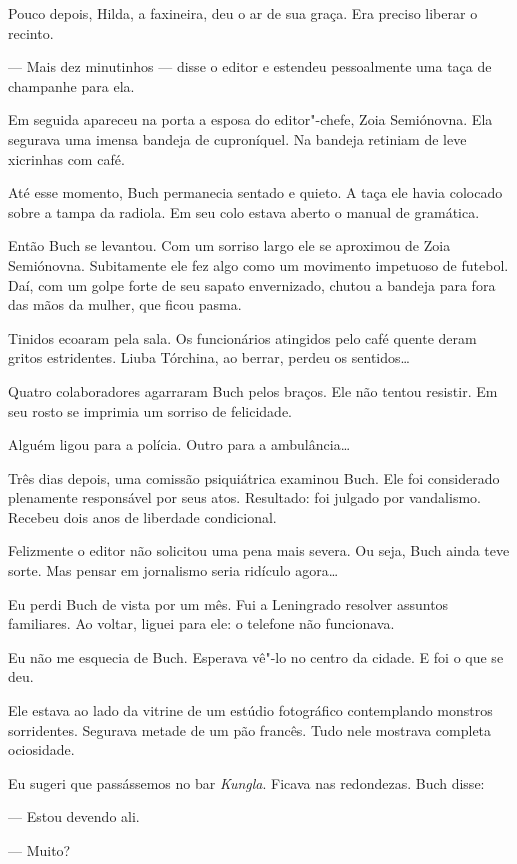 Pouco depois, Hilda, a faxineira, deu o ar de sua graça. Era preciso
liberar o recinto.

--- Mais dez minutinhos --- disse o editor e estendeu pessoalmente uma
taça de champanhe para ela.

Em seguida apareceu na porta a esposa do editor"-chefe, Zoia Semiónovna.
Ela segurava uma imensa bandeja de cuproníquel. Na bandeja retiniam de
leve xicrinhas com café.

Até esse momento, Buch permanecia sentado e quieto. A taça ele havia colocado
sobre a tampa da radiola. Em seu colo estava aberto o manual de
gramática.

Então Buch se levantou. Com um sorriso largo ele se aproximou de Zoia
Semiónovna. Subitamente ele fez algo como um movimento impetuoso de
futebol. Daí, com um golpe forte de seu sapato envernizado, chutou a
bandeja para fora das mãos da mulher, que ficou pasma.

Tinidos ecoaram pela sala. Os funcionários atingidos pelo café quente
deram gritos estridentes. Liuba Tórchina, ao berrar, perdeu os
sentidos\ldots{}

Quatro colaboradores agarraram Buch pelos braços. Ele não tentou
resistir. Em seu rosto se imprimia um sorriso de felicidade.

Alguém ligou para a polícia. Outro para a ambulância\ldots{}

Três dias depois, uma comissão psiquiátrica examinou Buch. Ele foi
considerado plenamente responsável por seus atos. Resultado: foi julgado
por vandalismo. Recebeu dois anos de liberdade condicional.

Felizmente o editor não solicitou uma pena mais severa. Ou seja, Buch
ainda teve sorte. Mas pensar em jornalismo seria ridículo agora\ldots{}

Eu perdi Buch de vista por um mês. Fui a Leningrado resolver assuntos
familiares. Ao voltar, liguei para ele: o telefone não funcionava.

Eu não me esquecia de Buch. Esperava vê"-lo no centro da cidade. E foi o
que se deu.

Ele estava ao lado da vitrine de um estúdio fotográfico contemplando
monstros sorridentes. Segurava metade de um pão francês. Tudo nele
mostrava completa ociosidade.

Eu sugeri que passássemos no bar \emph{Kungla}. Ficava nas redondezas.
Buch disse:

--- Estou devendo ali.

--- Muito?

